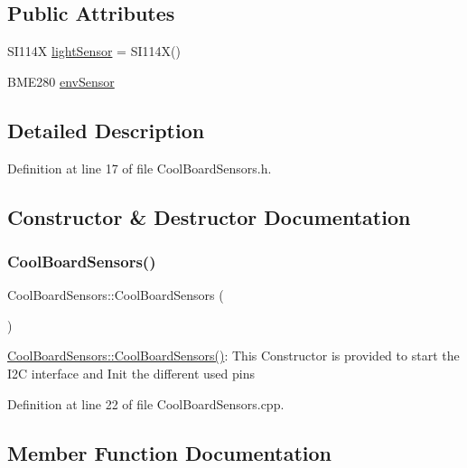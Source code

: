 \subsection*{Public Attributes}
\begin{DoxyCompactItemize}
\item 
S\+I114X \hyperlink{class_cool_board_sensors_a3e397300fb707dd193e909a757bf6102}{light\+Sensor} = S\+I114X()
\item 
B\+M\+E280 \hyperlink{class_cool_board_sensors_a868e38985e9a2412829fa2790ca13e2e}{env\+Sensor}
\end{DoxyCompactItemize}


\subsection{Detailed Description}


Definition at line 17 of file Cool\+Board\+Sensors.\+h.



\subsection{Constructor \& Destructor Documentation}
\mbox{\label{class_cool_board_sensors_a91ff2a02f5486f90cf2413a1cf8a9ed4}} 
\subsubsection{\texorpdfstring{Cool\+Board\+Sensors()}{CoolBoardSensors()}}
{\footnotesize\ttfamily Cool\+Board\+Sensors\+::\+Cool\+Board\+Sensors (\begin{DoxyParamCaption}{ }\end{DoxyParamCaption})}

\hyperlink{class_cool_board_sensors_a91ff2a02f5486f90cf2413a1cf8a9ed4}{Cool\+Board\+Sensors\+::\+Cool\+Board\+Sensors()}\+: This Constructor is provided to start the I2C interface and Init the different used pins 

Definition at line 22 of file Cool\+Board\+Sensors.\+cpp.



\subsection{Member Function Documentation}
\mbox{\label{class_cool_board_sensors_aa432c5aac88f89c31a10766390f23e0b}} 
